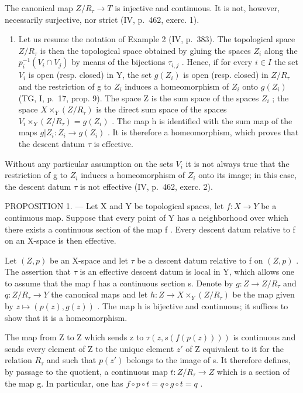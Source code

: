 The canonical map \(Z/R_{\tau} \rightarrow T\) is injective and continuous. It is not, however, necessarily surjective, nor strict (IV, p.~462, exerc. 1).

\begin{enumerate}
\def\labelenumi{\arabic{enumi})}
\setcounter{enumi}{1}
\tightlist
\item
  Let us resume the notation of Example 2 (IV, p.~383). The topological space \(Z/R_{\tau}\) is then the topological space obtained by gluing the spaces \(Z_{i}\) along the \(p_{i}^{-1}(V_{i} \cap V_{j})\) by means of the bijections \(\tau_{i,j}\) . Hence, if for every \(i \in I\) the set \(V_{i}\) is open (resp. closed) in Y, the set \(g(Z_{i})\) is open (resp. closed) in \(Z/R_{\tau}\) and the restriction of g to \(Z_{i}\) induces a homeomorphism of \(Z_{i}\) onto \(g(Z_{i})\) (TG, I, p.~17, prop. 9). The space Z is the sum space of the spaces \(Z_{i}\) ; the space \(X \times_{Y}(Z/R_{\tau})\) is the direct sum space of the spaces \(V_{i} \times_{Y}(Z/R_{\tau}) = g(Z_{i})\) . The map h is identified with the sum map of the maps \(g|Z_{i}: Z_{i} \to g(Z_{i})\) . It is therefore a homeomorphism, which proves that the descent datum \(\tau\) is effective.
\end{enumerate}

Without any particular assumption on the sets \(V_{i}\) it is not always true that the restriction of g to \(Z_{i}\) induces a homeomorphism of \(Z_{i}\) onto its image; in this case, the descent datum \(\tau\) is not effective (IV, p.~462, exerc. 2).

PROPOSITION 1. --- Let X and Y be topological spaces, let \(f: X \to Y\) be a continuous map. Suppose that every point of Y has a neighborhood over which there exists a continuous section of the map f . Every descent datum relative to f on an X-space is then effective.

Let \((Z,p)\) be an X-space and let \(\tau\) be a descent datum relative to f on \((Z,p)\) . The assertion that \(\tau\) is an effective descent datum is local in Y, which allows one to assume that the map f has a continuous section s. Denote by \(g: Z \to Z/R_{\tau}\) and \(q: Z/R_{\tau} \to Y\) the canonical maps and let \(h: Z \to X \times_{Y} (Z/R_{\tau})\) be the map given by \(z \mapsto (p(z), g(z))\) . The map h is bijective and continuous; it suffices to show that it is a homeomorphism.

The map from Z to Z which sends z to \(\tau(z,s(f(p(z))))\) is continuous and sends every element of Z to the unique element \(z'\) of Z equivalent to it for the relation \(R_{\tau}\) and such that \(p(z')\) belongs to the image of s. It therefore defines, by passage to the quotient, a continuous map \(t:Z/R_{\tau}\to Z\) which is a section of the map g. In particular, one has \(f\circ p\circ t=q\circ g\circ t=q\) .

